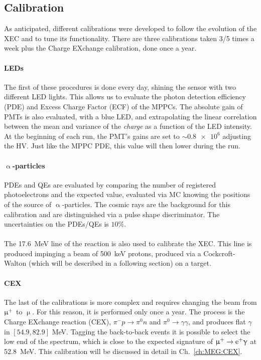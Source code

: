 \begin{refsection}
    \subsection{Calibration}    
    \label{sec:MEG:XEC:calibrations}
    As anticipated, different calibrations were developed to follow the evolution of the XEC and to tune its functionality. 
    There are three calibrations taken 3/5 times a week plus the Charge EXchange calibration, done once a year.
    
    \paragraph{LEDs} The first of these procedures is done every day, shining the sensor with two different LED lights. 
    This allows us to evaluate the photon detection efficiency (PDE) and Excess Charge Factor (ECF) of the MPPCs.
    The absolute gain of PMTs is also evaluated, with a blue LED, and extrapolating the linear correlation between the mean and variance of the \textit{charge} as a function of the LED intensity. 
    At the beginning of each run, the PMT's gains are set to $\sim\num{0.8e6}$ adjusting the HV. 
    Just like the MPPC PDE, this value will then lower during the run.

    \paragraph{$\upalpha$-particles} PDEs and QEs are evaluated by comparing the number of registered photoelectrons and the expected value, evaluated via MC knowing the positions of the  source of $\upalpha$-particles.
    The cosmic rays are the background for this calibration and are distinguished via a pulse shape discriminator.
    The uncertainties on the PDEs/QEs is $10\%$.

    \paragraph{}
    The \SI{17.6}{MeV} line of the  reaction is also used to calibrate the XEC.
    This line is produced impinging a beam of \SI{500}{keV} protons, produced via a Cockcroft-Walton (which will be described in a following section) on a  target.

    \paragraph{CEX}
    The last of the calibrations is more complex and requires changing the beam from $\upmu^+$ to $\upmu$. 
    For this reason, it is performed only once a year.
    The process is the Charge EXchange reaction (CEX), $\pi^-p\rightarrow \pi^0n$ and $\pi^0\rightarrow\gamma\gamma$, and produces flat $\gamma$ in $[54.9,82.9]$ MeV.
    Tagging the back-to-back events it is possible to select the low end of the spectrum, which is close to the expected signature of $\upmu^+\rightarrow\text{e}^+\upgamma$ at \SI{52.8}{MeV}. This calibration will be discussed in detail in Ch.~\ref{ch:MEG:CEX}.


\end{refsection}
